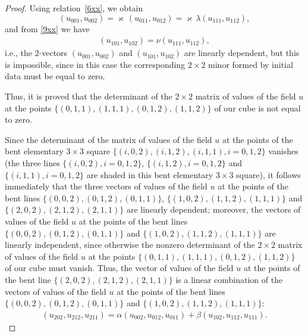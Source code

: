 \begin{proof}
Using relation~\eqref{6xx}, we obtain \[ (u_{0 0 1}, u_{0 0 2}) =
\varkappa \, (u_{0 1 1}, u_{0 1 2}) = \varkappa \, \lambda (u_{1 1
1}, u_{1 1 2}), \] and from \eqref{9xx} we have
\begin{gather*} (u_{1 0 1},
u_{1 0 2}) = \nu (u_{1 1 1}, u_{1 1 2}), %
\end{gather*} i.e., the
$2$-vectors $(u_{0 0 1}, u_{0 0 2})$ and $(u_{1 0 1}, u_{1 0 2})$
are linearly dependent, but this is impossible, since in this case
the corresponding $2 \times 2$ minor formed by initial data must be
equal to zero.


Thus, it is proved that the determinant of the $2 \times 2$ matrix
of values of the f\/ield $u$ at the points $\{(0, 1, 1), (1, 1, 1),
(0, 1, 2), (1, 1, 2)\}$ of our cube is not equal to zero.


Since the determinant of the matrix of values of the f\/ield $u$ at
the points of the bent elementary $3 \times 3$ square $\{(i, 0, 2),
(i, 1, 2), (i, 1, 1), i = 0, 1, 2\}$ vanishes (the three lines
$\{(i, 0, 2), i = 0, 1, 2\}$, $\{(i, 1, 2), i = 0, 1, 2\}$ and
$\{(i, 1, 1), i = 0, 1, 2\}$ are shaded in this bent elementary $3
\times 3$ square), it follows immediately that the three vectors of
values of the f\/ield $u$ at the points of the bent lines $\{(0, 0,
2), (0, 1, 2), (0, 1, 1)\}$, $\{(1, 0, 2), (1, 1, 2), (1, 1, 1)\}$
and $\{(2, 0, 2), (2, 1, 2), (2, 1, 1)\}$ are linearly dependent;
moreover, the vectors of values of the f\/ield $u$ at the points of
the bent lines $\{(0, 0, 2), (0, 1, 2), (0, 1, 1)\}$ and $\{(1, 0,
2), (1, 1, 2), (1, 1, 1)\}$ are linearly independent, since
otherwise the nonzero determinant of the $2 \times 2$ matrix of
values of the f\/ield $u$ at the points $\{(0, 1, 1), (1, 1, 1), (0,
1, 2), (1, 1, 2)\}$ of our cube must vanish. Thus, the vector of
values of the f\/ield $u$ at the points of the bent line $\{(2, 0, 2),
(2, 1, 2), (2, 1, 1)\}$ is a linear combination of the vectors of
values of the f\/ield $u$ at the points of the bent lines $\{(0, 0,
2), (0, 1, 2), (0, 1, 1)\}$ and $\{(1, 0, 2), (1, 1, 2), (1, 1,
1)\}$: \begin{gather} (u_{2 0 2}, u_{2 1 2}, u_{2 1 1}) = \alpha (u_{0 0 2},
u_{0 1 2}, u_{0 1 1}) + \beta (u_{1 0 2}, u_{1 1 2}, u_{1 1 1}).
\label{7xxy} \end{gather}



\end{proof}
